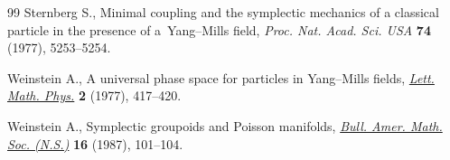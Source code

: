 \begin{thebibliography}{99}
Sternberg S., Minimal coupling and the symplectic mechanics of a classical
 particle in the presence of a~{Y}ang--{M}ills f\/ield, \textit{Proc. Nat. Acad.
 Sci. USA} \textbf{74} (1977), 5253--5254.

Weinstein A., A universal phase space for particles in {Y}ang--{M}ills f\/ields,
 \href{https://doi.org/10.1007/BF00400169}{\textit{Lett. Math. Phys.}} \textbf{2} (1977), 417--420.

Weinstein A., Symplectic groupoids and {P}oisson manifolds, \href{https://doi.org/10.1090/S0273-0979-1987-15473-5}{\textit{Bull. Amer.
 Math. Soc. (N.S.)}} \textbf{16} (1987), 101--104.

\end{thebibliography}
